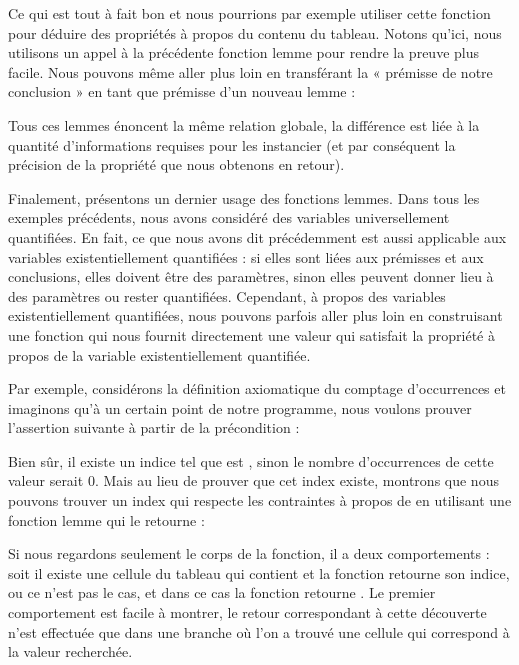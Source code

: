 

Ce qui est tout à fait bon et nous pourrions par exemple utiliser cette fonction
pour déduire des propriétés à propos du contenu du tableau. Notons qu'ici, nous
utilisons un appel à la précédente fonction lemme pour rendre la preuve
plus facile. Nous pouvons même aller plus loin en transférant la « prémisse de
notre conclusion » en tant que prémisse d'un nouveau lemme :





Tous ces lemmes énoncent la même relation globale, la différence est liée à la
quantité d'informations requises pour les instancier (et par conséquent la
précision de la propriété que nous obtenons en retour).


Finalement, présentons un dernier usage des fonctions lemmes. Dans tous les
exemples précédents, nous avons considéré des variables universellement quantifiées.
En fait, ce que nous avons dit précédemment est aussi applicable aux variables
existentiellement quantifiées : si elles sont liées aux prémisses et aux
conclusions, elles doivent être des paramètres, sinon elles peuvent donner lieu
à des paramètres ou rester quantifiées. Cependant, à propos des variables
existentiellement quantifiées, nous pouvons parfois aller plus loin en construisant
une fonction qui nous fournit directement une valeur qui satisfait la propriété
à propos de la variable existentiellement quantifiée.



Par exemple, considérons la définition axiomatique du comptage d'occurrences et
imaginons qu'à un certain point de notre programme, nous voulons prouver
l'assertion suivante à partir de la précondition :




Bien sûr, il existe un indice  tel que  est
, sinon le nombre d'occurrences de cette valeur serait $0$.
Mais au lieu de prouver que cet index existe, montrons que nous pouvons trouver
un index qui respecte les contraintes à propos de  en utilisant
une fonction lemme qui le retourne :




Si nous regardons seulement le corps de la fonction, il a deux comportements :
soit il existe une cellule du tableau qui contient  et la fonction
retourne son indice, ou ce n'est pas le cas, et dans ce cas la fonction retourne
. Le premier comportement est facile à montrer, le retour
correspondant à cette découverte n'est effectuée que dans une branche où l'on a
trouvé une cellule qui correspond à la valeur recherchée.


